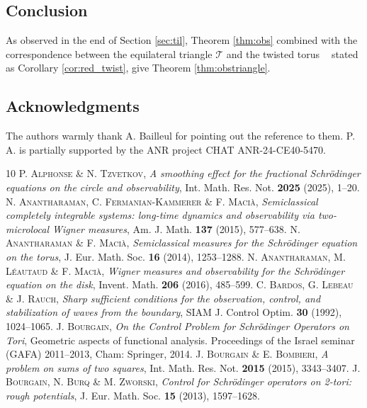 \documentclass[a4paper,11pt]{amsart}
\numberwithin{equation}{section}
\theoremstyle{definition}
\DeclareMathOperator{\tori}{\mathbb T^2[\omega]}
\begin{document}
\subsection{Conclusion} As observed in the end of Section \ref{sec:til}, Theorem \ref{thm:obs} combined with the correspondence between the equilateral triangle $\mathcal T$ and the twisted torus $\tori$ stated as Corollary \ref{cor:red_twist}, give Theorem \ref{thm:obstriangle}.
\subsection*{Acknowledgments} The authors warmly thank A. Bailleul for pointing out the reference \cite{HW} to them. P. A. is partially supported by the ANR project CHAT ANR-24-CE40-5470. 

\begin{thebibliography}{10}
     P. \textsc{Alphonse} \& N. \textsc{Tzvetkov}, \textit{A smoothing effect for the fractional Schr\"odinger equations on the circle and observability}, Int. Math. Res. Not. \textbf{2025} (2025), 1--20.
     N. \textsc{Anantharaman}, C. \textsc{Fermanian-Kammerer} \& F. \textsc{Maci\`a}, \textit{Semiclassical completely integrable systems: long-time dynamics and observability via two-microlocal Wigner measures}, Am. J. Math. \textbf{137} (2015), 577--638.
	 N. \textsc{Anantharaman} \& F. \textsc{Maci\`a}, \textit{Semiclassical measures for the {Schr\"odinger} equation on the torus}, J. Eur. Math. Soc. \textbf{16} (2014), 1253--1288.
	 N. \textsc{Anantharaman}, M. \textsc{L\'eautaud} \& F. \textsc{Maci\`a}, \textit{Wigner measures and observability for the Schr\"odinger equation on the disk}, Invent. Math. \textbf{206} (2016), 485--599.
     C. \textsc{Bardos}, G. \textsc{Lebeau} \& J. \textsc{Rauch}, \textit{Sharp sufficient conditions for the observation,
control, and stabilization of waves from the boundary}, SIAM J. Control Optim. \textbf{30} (1992), 1024--1065.
     J. \textsc{Bourgain}, \textit{On the Control Problem for Schr\"odinger Operators on Tori}, Geometric aspects of functional analysis. Proceedings of the Israel seminar (GAFA) 2011--2013, Cham: Springer, 2014.
     J. \textsc{Bourgain} \& E. \textsc{Bombieri}, \textit{A problem on sums of two squares}, Int. Math. Res. Not. \textbf{2015} (2015), 3343--3407.
	 J. \textsc{Bourgain}, N. \textsc{Burq} \& M. \textsc{Zworski}, \textit{Control for Schr\"odinger operators on 2-tori: rough potentials}, J. Eur. Math. Soc. \textbf{15} (2013), 1597--1628.

\end{thebibliography}
\end{document}
